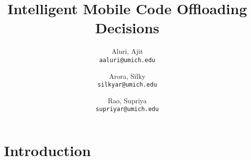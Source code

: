 \documentclass[conference]{IEEEtran}
\begin{document}
\title{Intelligent Mobile Code Offloading Decisions}


\author{
  Aluri, Ajit\\
  \texttt{aaluri@umich.edu}
  \and
  Arora, Silky\\
  \texttt{silkyar@umich.edu}
  \and
  Rao, Supriya\\
  \texttt{supriyar@umich.edu}
}

\date{}
\maketitle

\thispagestyle{empty}
\begin{abstract}

\end{abstract}
\section{Introduction}

%
%
%
%
%
%
\end{document}
